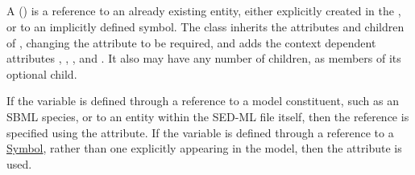 \subsection{}
\label{class:variable}
\label{class:listOfVariables}
A \Variable () is a reference to an already existing entity, either explicitly created in the \SedDocument, or to an implicitly defined symbol.  The \Variable class inherits the attributes and children of \SEDBase, changing the attribute  to be required, and adds the context dependent attributes \hyperref[sec:target]{}, \hyperref[sec:symbol]{}, \hyperref[sec:taskReferenceAttribute]{}, and \hyperref[sec:modelReferenceAttribute]{}. It also may have any number of \RemainingDimension children, as members of its \ListOfRemainingDimensions optional child.


If the variable is defined through a reference to a model constituent, such as an SBML species, or to an entity within the SED-ML file itself, then the reference is specified using the \hyperref[sec:target]{} attribute. If the variable is defined through a reference to a \hyperref[sec:implicitVariable]{Symbol}, rather than one explicitly appearing in the model, then the \hyperref[sec:symbol]{} attribute is used. 

